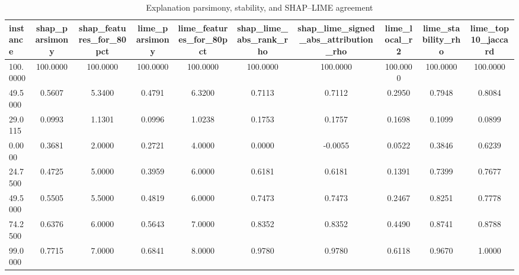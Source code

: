 \begin{table}
\centering
\caption{Explanation parsimony, stability, and SHAP--LIME agreement}
\label{tab:explanation_quality}
\begin{tabular}{lccccccccc}
\toprule
instance & shap_parsimony & shap_features_for_80pct & lime_parsimony & lime_features_for_80pct & shap_lime_abs_rank_rho & shap_lime_signed_abs_attribution_rho & lime_local_r2 & lime_stability_rho & lime_top10_jaccard \\
\midrule
100.0000 & 100.0000 & 100.0000 & 100.0000 & 100.0000 & 100.0000 & 100.0000 & 100.0000 & 100.0000 & 100.0000 \\
49.5000 & 0.5607 & 5.3400 & 0.4791 & 6.3200 & 0.7113 & 0.7112 & 0.2950 & 0.7948 & 0.8084 \\
29.0115 & 0.0993 & 1.1301 & 0.0996 & 1.0238 & 0.1753 & 0.1757 & 0.1698 & 0.1099 & 0.0899 \\
0.0000 & 0.3681 & 2.0000 & 0.2721 & 4.0000 & 0.0000 & -0.0055 & 0.0522 & 0.3846 & 0.6239 \\
24.7500 & 0.4725 & 5.0000 & 0.3959 & 6.0000 & 0.6181 & 0.6181 & 0.1391 & 0.7399 & 0.7677 \\
49.5000 & 0.5505 & 5.5000 & 0.4819 & 6.0000 & 0.7473 & 0.7473 & 0.2467 & 0.8251 & 0.7778 \\
74.2500 & 0.6376 & 6.0000 & 0.5643 & 7.0000 & 0.8352 & 0.8352 & 0.4490 & 0.8741 & 0.8788 \\
99.0000 & 0.7715 & 7.0000 & 0.6841 & 8.0000 & 0.9780 & 0.9780 & 0.6118 & 0.9670 & 1.0000 \\
\bottomrule
\end{tabular}
\end{table}
